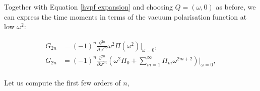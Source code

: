 \documentclass{article}
\numberwithin{equation}{section} %
\begin{document}
Together with Equation \ref{hvpf expansion} and choosing $Q=(\omega,0)$ as before, we can express the time moments in terms of the vacuum polarisation function at low $\omega^2$:

\begin{equation}
\begin{split}
G_{2n}&=  (-1)^{n} \frac{\partial^{2n}}{\partial \omega^{2n}} \omega^2 \Pi(\omega^2)\bigg \vert_{\omega=0} ,\\
G_{2n}&=  (-1)^{n} \frac{\partial^{2n}}{\partial \omega^{2n}} (\omega^2 \Pi_0 + \sum_{m=1}^\infty \Pi_m \omega^{2m+2})\bigg \vert_{\omega=0} ,\\
\end{split}
\end{equation}

Let us compute the first few orders of $n$,

\end{document}
